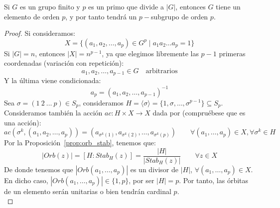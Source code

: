 \begin{teo}[de Cauchy]
    Si $G$ es un grupo finito y $p$ es un primo que divide a $|G|$, entonces $G$ tiene un elemento de orden $p$, y por tanto tendrá un $p-$subgrupo de orden $p$.
    \begin{proof}
        Si consideramos:
        \begin{equation*}
            X = \{(a_1, a_2, \ldots, a_p) \in G^p \mid a_1 a_2 \ldots a_p = 1\}
        \end{equation*}
        Si $|G| = n$, entonces $|X| = n^{p-1}$, ya que elegimos libremente las $p-1$ primeras coordenadas (variación con repetición):
        \begin{equation*}
            a_1, a_2, \ldots, a_{p-1} \in G \quad \text{arbitrarios}
        \end{equation*}
        Y la última viene condicionada:
        \begin{equation*}
            a_p = {(a_1, a_2, \ldots, a_{p-1})}^{-1}
        \end{equation*}
        Sea $\sigma = (1\ 2\ \ldots\ p)  \in S_p$, consideramos $H = \langle \sigma \rangle  = \{1, \sigma, \ldots, \sigma^{p-1}\} \subseteq S_p$. Consideramos también la acción $ac:H\times X \to X$ dada por (compruébese que es una acción):
        \begin{equation*}
            ac(\sigma^k, (a_1,a_2,\ldots,a_p)) = \left(a_{\sigma^k(1)}, a_{\sigma^k(2)}, \ldots, a_{\sigma^k(p)}\right) \qquad \forall (a_1,\ldots,a_p)\in X, \forall \sigma^k\in H
        \end{equation*}
        Por la Proposición~\ref{prop:orb_stab}, tenemos que:
        \begin{equation*}
            |Orb(z)| = [H:Stab_H(z)] = \dfrac{|H|}{|Stab_H(z)|} \qquad \forall z\in X
        \end{equation*}
        De donde tenemos que $|Orb(a_1,\ldots,a_p)|$ es un divisor de $|H|$, $\forall (a_1,\ldots,a_p)\in X$. En dicho caso, $|Orb(a_1,\ldots,a_p)|\in \{1,p\}$, por ser $|H| = p$. Por tanto, las órbitas de un elemento serán unitarias o bien tendrán cardinal $p$.\\


\end{proof}
\end{teo}
